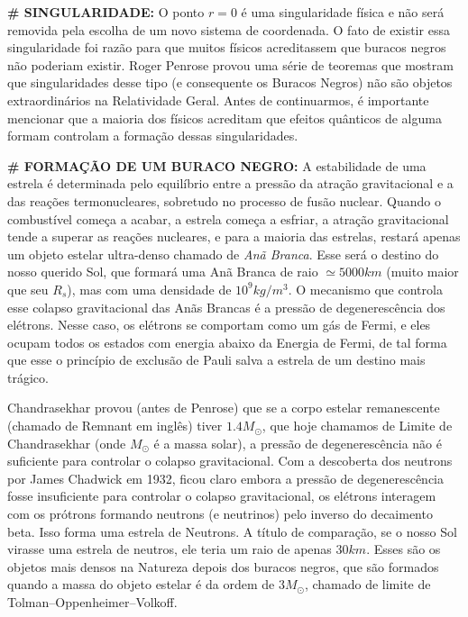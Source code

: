 \documentclass[11pt]{article}
\begin{document}
    \textbf{\# SINGULARIDADE:} O ponto \(r=0\) é uma singularidade física e
não será removida pela escolha de um novo sistema de coordenada. O fato
de existir essa singularidade foi razão para que muitos físicos
acreditassem que buracos negros não poderiam existir. Roger Penrose
provou uma série de teoremas que mostram que singularidades desse tipo
(e consequente os Buracos Negros) não são objetos extraordinários na
Relatividade Geral. Antes de continuarmos, é importante mencionar que a
maioria dos físicos acreditam que efeitos quânticos de alguma formam
controlam a formação dessas singularidades.

    \textbf{\# FORMAÇÃO DE UM BURACO NEGRO:} A estabilidade de uma estrela é
determinada pelo equilíbrio entre a pressão da atração gravitacional e a
das reações termonucleares, sobretudo no processo de fusão nuclear.
Quando o combustível começa a acabar, a estrela começa a esfriar, a
atração gravitacional tende a superar as reações nucleares, e para a
maioria das estrelas, restará apenas um objeto estelar ultra-denso
chamado de \emph{Anã Branca}. Esse será o destino do nosso querido Sol,
que formará uma Anã Branca de raio \(\simeq 5000 km\) (muito maior que
seu \(R_s\)), mas com uma densidade de \(10^9 kg /m^3\). O mecanismo que
controla esse colapso gravitacional das Anãs Brancas é a pressão de
degenerescência dos elétrons. Nesse caso, os elétrons se comportam como
um gás de Fermi, e eles ocupam todos os estados com energia abaixo da
Energia de Fermi, de tal forma que esse o princípio de exclusão de Pauli
salva a estrela de um destino mais trágico.

Chandrasekhar provou (antes de Penrose) que se a corpo estelar
remanescente (chamado de Remnant em inglês) tiver \(1.4 M_{\odot}\), que
hoje chamamos de Limite de Chandrasekhar (onde \(M_{\odot}\) é a massa
solar), a pressão de degenerescência não é suficiente para controlar o
colapso gravitacional. Com a descoberta dos neutrons por James Chadwick
em 1932, ficou claro embora a pressão de degenerescência fosse
insuficiente para controlar o colapso gravitacional, os elétrons
interagem com os prótrons formando neutrons (e neutrinos) pelo inverso
do decaimento beta. Isso forma uma estrela de Neutrons. A título de
comparação, se o nosso Sol virasse uma estrela de neutros, ele teria um
raio de apenas \(30km\). Esses são os objetos mais densos na Natureza
depois dos buracos negros, que são formados quando a massa do objeto
estelar é da ordem de \(3M_{\odot}\), chamado de limite de
Tolman--Oppenheimer--Volkoff.
\end{document}
